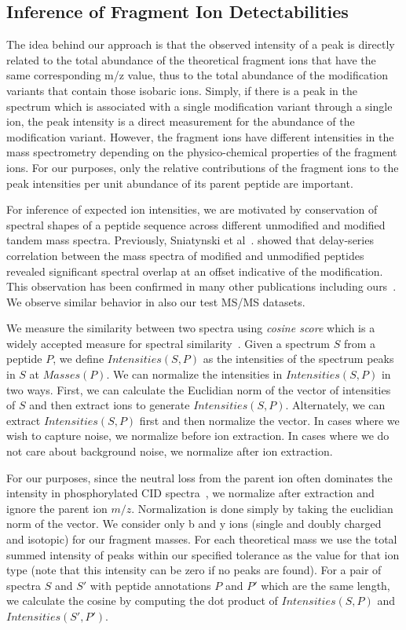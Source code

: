 \subsection{Inference of Fragment Ion Detectabilities}\label{sec:inferDetectabilities}
The idea behind our approach is that the observed intensity of a peak is
directly related to the total abundance of the theoretical fragment
ions that have the same corresponding m/z value, thus to the total
abundance of the modification variants that contain those isobaric
ions. Simply, if there is a peak in the spectrum which is associated
with a single modification variant through a single ion, the peak
intensity is a direct measurement for the abundance of the
modification variant. However, the fragment ions have different
intensities in the mass spectrometry depending on the
physico-chemical properties of the fragment ions. For our purposes,
only the relative contributions of the fragment ions to the peak
intensities per unit abundance of its parent peptide are
important.

For inference of expected ion intensities, we are motivated by
conservation of spectral shapes of a peptide sequence across different
unmodified and modified tandem mass spectra. Previously, Sniatynski et
al~\cite{Sniatynski2006}. showed that delay-series
correlation between the mass spectra of modified and unmodified
peptides revealed significant spectral overlap at an offset indicative
of the modification. This observation has been confirmed in many other
publications including ours~\cite{bandeira10chapter}. We
observe similar behavior in also our test MS/MS datasets.

We measure the similarity between two spectra using \emph{cosine score} which is a widely accepted measure for
spectral similarity~\cite{lam07}. Given a spectrum $S$ from a peptide $P$, we define $Intensities(S,P)$ as the intensities of the spectrum peaks in $S$ at $Masses(P)$.
We can normalize the intensities in $Intensities(S,P)$ in two ways. First, we can calculate the Euclidian norm of the 
vector of intensities of $S$ and then extract ions to generate $Intensities(S,P)$. Alternately, we can extract $Intensities(S,P)$ first and then normalize the vector. 
In cases where we wish to capture noise, we normalize before ion extraction. In cases where 
we do not care about background noise, we normalize after ion extraction. 

For our purposes, since the neutral loss from the parent ion often dominates the intensity in phosphorylated CID spectra~\cite{Tholey1999,Moyer2002}, 
we normalize after extraction and ignore the parent ion $m/z$. Normalization is done simply by taking the euclidian norm of the vector. 
We consider only b and y ions (single and doubly charged and isotopic) for our fragment masses. 
For each theoretical mass we use the total summed intensity of peaks within our specified tolerance as the 
value for that ion type (note that this intensity can be zero if no peaks are found). 
For a pair of spectra $S$ and $S'$ with peptide annotations $P$ and $P'$ which are the same length, we calculate the 
cosine by computing the dot product of $Intensities(S,P)$ and $Intensities(S',P')$. 



